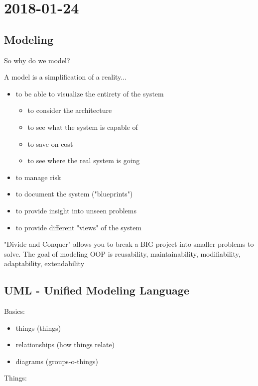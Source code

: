 \section{2018-01-24}

\subsection{Modeling}

So why do we model?

A model is a simplification of a reality...

\begin{itemize}
  \item to be able to visualize the entirety of the system
  \begin{itemize}
    \item to consider the architecture
    \item to see what the system is capable of 
    \item to save on cost
    \item to see where the real system is going
  \end{itemize}
  \item to manage risk
  \item to document the system ("blueprints")
  \item to provide insight into unseen problems
  \item to provide different "views" of the system
\end{itemize}

"Divide and Conquer" allows you to break a BIG project into smaller problems to solve. The goal of modeling OOP is reusability, maintainability, modifiability, adaptability, extendability

\subsection{UML - Unified Modeling Language}

Basics:

\begin{itemize}
  \item things (things)
  \item relationships (how things relate)
  \item diagrams (groups-o-things)
\end{itemize}

Things:

